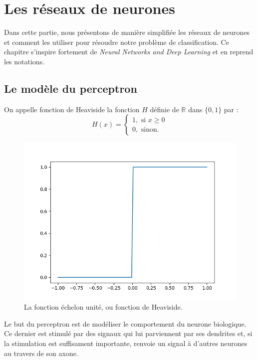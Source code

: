 
\chapter{Les réseaux de neurones}

Dans cette partie, nous présentons de manière simplifiée les réseaux de neurones 
et comment les utiliser pour résoudre notre problème de classification.
Ce chapitre s'inspire fortement de \textit{Neural Networks and Deep Learning}\cite{neuralnetworksanddeeplearning} 
et en reprend les notations.


\section{Le modèle du perceptron}



\begin{definition}
On appelle fonction de Heaviside la fonction $H$ définie de $\mathbb{R}$ dans $\{0, 1\}$ par :
\[
H(x) = 
\begin{cases}
 1, \text{ si } x \geq 0 \\
 0, \text{ sinon.} 
 \end{cases}
\]
\end{definition}

\begin{figure}[h]
  \centering
  \includegraphics[scale=0.5]{assets/heaviside}
  \caption{La fonction échelon unité, ou fonction de Heaviside.}
  \label{fig:heaviside}
\end{figure}

Le but du perceptron est de modéliser le comportement du neurone biologique. 
Ce dernier est stimulé par des signaux qui lui parviennent par ses dendrites et, si 
la stimulation est suffisament importante, renvoie un signal à d'autres neurones au travers de son axone.

